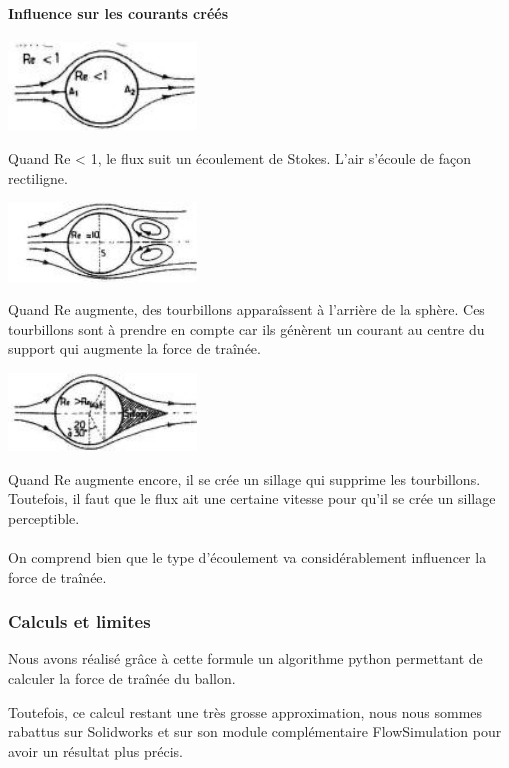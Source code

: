 \documentclass[a4paper,11pt]{article}
\begin{document}
\paragraph{Influence sur les courants créés}
	\begin{center}
		\includegraphics[width=5cm]{../Images/re0.jpg}
	\end{center}
	Quand Re < 1, le flux suit un écoulement de Stokes. L'air s'écoule de façon rectiligne.
	\begin{center}
		\includegraphics[width=5cm]{../Images/re1.jpg}
	\end{center}
	Quand Re augmente, des tourbillons apparaîssent à l’arrière de la sphère. Ces tourbillons sont à prendre en compte car ils génèrent un courant au centre du support qui augmente la force de traînée.
	\begin{center}
		\includegraphics[width=5cm]{../Images/re2.jpg}
	\end{center}
	Quand Re augmente encore, il se crée un sillage qui supprime les tourbillons.\\
	Toutefois, il faut que le flux ait une certaine vitesse pour qu'il se crée un sillage perceptible.\\
	\\
	On comprend bien que le type d'écoulement va considérablement influencer la force de traînée.


\subsubsection{Calculs et limites}
	Nous avons réalisé grâce à cette formule un algorithme python permettant de calculer la force de traînée du ballon.\\
	
	Toutefois, ce calcul restant une très grosse approximation, nous nous sommes rabattus sur Solidworks et sur son module complémentaire FlowSimulation pour avoir un résultat plus précis.
\end{document}
